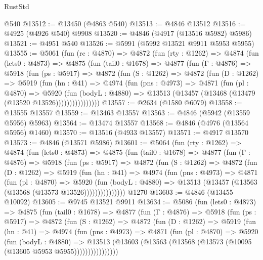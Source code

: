 \begin{lexlean}{RustStd}
\begin{coremodule}
    @540
@13512 := @13450 (@4863 @540)
@13513 := @4846 @13512
@13516 := @4925 (@4926 @540) @9908
@13520 := @4846 (@4917 (@13516 @5982) @5986)
@13521 := @4951 @540
@13526 := @5991 (@5992 @13521 @9911 @5953 @5955)
@13555 := @5061
    (fun (rc : @4870) =>
    @4872
      (fun (rty : @1262) =>
      @4874
        (fun (lets0 : @4873) =>
        @4875
          (fun (tail0 : @1678) =>
          @4877
            (fun (Γ : @4876) =>
            @5918
              (fun (ps : @5917) =>
              @4872
                (fun (S : @1262) =>
                @4872
                  (fun (D : @1262) =>
                  @5919
                    (fun (hn : @41) =>
                    @4974
                      (fun (pns : @4973) =>
                      @4871
                        (fun (pl : @4870) =>
                        @5920
                          (fun (bodyL : @4880) =>
                          @13513 (@13457 (@13468 (@13479 (@13520 @13526))))))))))))))))
@13557 := @2634 (@1580 @6079)
@13558 := @13555 @13557
@13559 := @13463 @13557
@13563 := @4846 (@5942 (@13559 @5956) @5963)
@13564 := @13474 @13557
@13568 := @4846 (@4976 (@13564 @5956) @1460)
@13570 := @13516 (@4933 @13557)
@13571 := @4917 @13570
@13573 := @4846 (@13571 @5986)
@13601 := @5064
    (fun (rty : @1262) =>
    @4874
      (fun (lets0 : @4873) =>
      @4875
        (fun (tail0 : @1678) =>
        @4877
          (fun (Γ : @4876) =>
          @5918
            (fun (ps : @5917) =>
            @4872
              (fun (S : @1262) =>
              @4872
                (fun (D : @1262) =>
                @5919
                  (fun (hn : @41) =>
                  @4974
                    (fun (pns : @4973) =>
                    @4871
                      (fun (pl : @4870) =>
                      @5920
                        (fun (bodyL : @4880) =>
                        @13513 (@13457 (@13563 (@13568 (@13573 @13526)))))))))))))))
    @1270
@13603 := @4846 (@13455 @10092)
@13605 := @9745 @13521 @9911
@13634 := @5086
    (fun (lets0 : @4873) =>
    @4875
      (fun (tail0 : @1678) =>
      @4877
        (fun (Γ : @4876) =>
        @5918
          (fun (ps : @5917) =>
          @4872
            (fun (S : @1262) =>
            @4872
              (fun (D : @1262) =>
              @5919
                (fun (hn : @41) =>
                @4974
                  (fun (pns : @4973) =>
                  @4871
                    (fun (pl : @4870) =>
                    @5920
                      (fun (bodyL : @4880) =>
                      @13513
                        (@13603 (@13563 (@13568 (@13573 (@10095 (@13605 @5953 @5955))))))))))))))))

\end{coremodule}
\end{lexlean}
